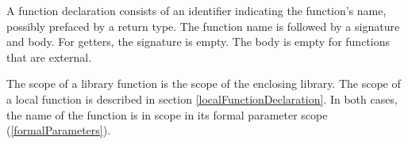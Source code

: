 \documentclass{article}
\begin{document}
\LMHash{}
A function declaration consists of an identifier indicating the function's name, possibly prefaced by a return type.
The function name is followed by a signature and body.
For getters, the signature is empty.
The body is empty for functions that are external.

\LMHash{}
The scope of a library function is the scope of the enclosing library.
The scope of a local function is described in section \ref{localFunctionDeclaration}.
In both cases, the name of the function is in scope in its formal parameter scope (\ref{formalParameters}).





\end{document}
